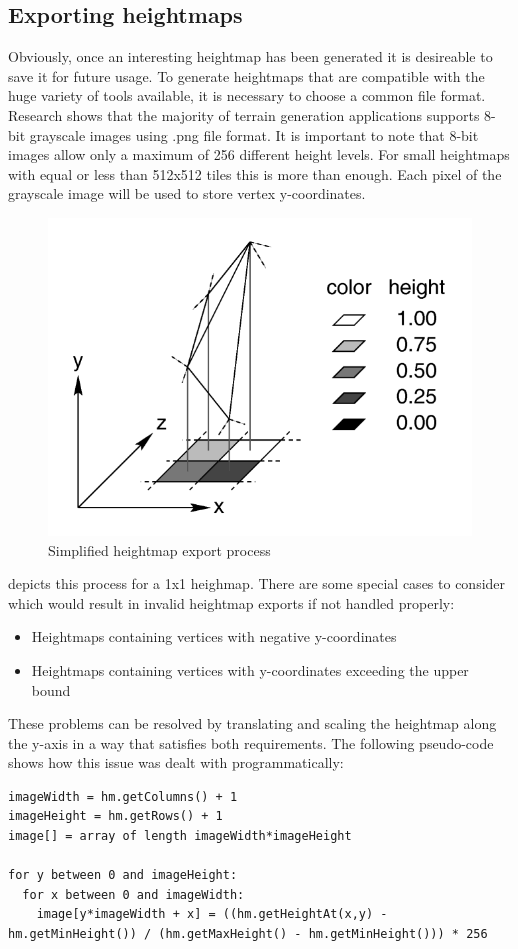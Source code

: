 \documentclass[11pt,a4paper,twoside,openright]{report}
\begin{document}
\subsection{Exporting heightmaps}
\label{subsec:exportingheightmaps}
Obviously, once an interesting heightmap has been generated it is desireable to save it for future usage. To generate heightmaps that are compatible with the huge variety of tools available, it is necessary to choose a common file format. Research shows that the majority of terrain generation applications supports 8-bit grayscale images using .png file format. It is important to note that 8-bit images allow only a maximum of 256 different height levels. For small heightmaps with equal or less than 512x512 tiles this is more than enough. Each pixel of the grayscale image will be used to store vertex y-coordinates.
\begin{figure}[h]
\centering
\includegraphics[width=0.4\linewidth]{pixhfld.png}
\caption{
  Simplified heightmap export process \cite{POVRay:HeightField}
}
\label{fig:heightfield}
\end{figure}
 depicts this process for a 1x1 heighmap. There are some special cases to consider which would result in invalid heightmap exports if not handled properly:
\begin{itemize}
  \item Heightmaps containing vertices with negative y-coordinates
  \item Heightmaps containing vertices with y-coordinates exceeding the upper bound
\end{itemize}
These problems can be resolved by translating and scaling the heightmap along the y-axis in a way that satisfies both requirements. The following pseudo-code shows how this issue was dealt with programmatically:
\begin{lstlisting}[caption=Heightmap export pseudo-code]
imageWidth = hm.getColumns() + 1
imageHeight = hm.getRows() + 1
image[] = array of length imageWidth*imageHeight

for y between 0 and imageHeight:
  for x between 0 and imageWidth:
    image[y*imageWidth + x] = ((hm.getHeightAt(x,y) - hm.getMinHeight()) / (hm.getMaxHeight() - hm.getMinHeight())) * 256
\end{lstlisting}
\end{document}
